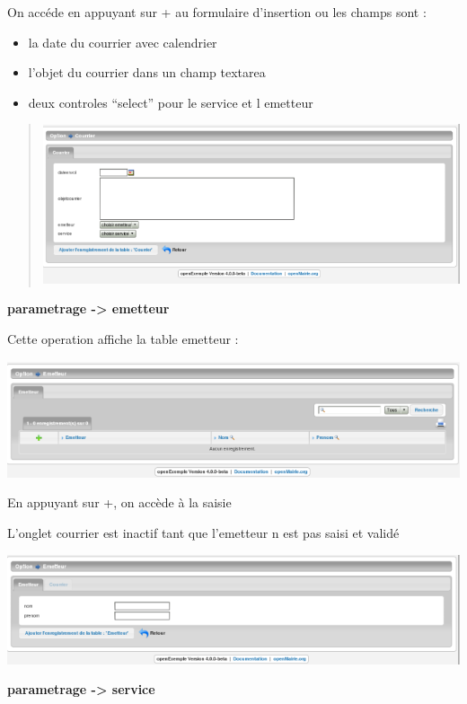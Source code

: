\documentclass[letterpaper,10pt,french]{manual}
\begin{document}
On accéde en appuyant sur + au formulaire d'insertion ou les champs sont :
\begin{itemize}
\item {} 
la date du courrier avec calendrier

\item {} 
l'objet du courrier dans un champ textarea

\item {} 
deux controles ``select'' pour le service et l emetteur

\end{itemize}
\begin{quote}

\includegraphics{utilisation_4.png}
\end{quote}

\textbf{parametrage -\textgreater{} emetteur}

Cette operation affiche la table emetteur :

\includegraphics{utilisation_5.png}

En appuyant sur +, on accède à la saisie

L'onglet courrier est inactif tant que l'emetteur n est pas saisi et validé

\includegraphics{utilisation_6.png}

\textbf{parametrage -\textgreater{} service}
\end{document}
